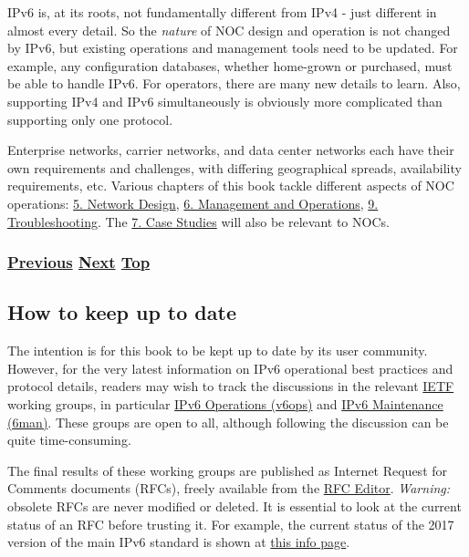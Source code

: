 \documentclass[
]{article}
\begin{document}
IPv6 is, at its roots, not fundamentally different from IPv4 - just
different in almost every detail. So the \emph{nature} of NOC design and
operation is not changed by IPv6, but existing operations and management
tools need to be updated. For example, any configuration databases,
whether home-grown or purchased, must be able to handle IPv6. For
operators, there are many new details to learn. Also, supporting IPv4
and IPv6 simultaneously is obviously more complicated than supporting
only one protocol.

Enterprise networks, carrier networks, and data center networks each
have their own requirements and challenges, with differing geographical
spreads, availability requirements, etc. Various chapters of this book
tackle different aspects of NOC operations: \hyperref[network-design]{5.
Network Design}, \hyperref[management-and-operations]{6. Management and
Operations}, \hyperref[troubleshooting]{9. Troubleshooting}. The
\hyperref[case-studies]{7. Case Studies} will also be relevant to NOCs.

\subsubsection{\texorpdfstring{\hyperref[how-an-application-programmer-sees-ipv6]{Previous}
\hyperref[how-to-keep-up-to-date]{Next}
\hyperref[introduction-and-foreword]{Top}}{Previous Next Top}}\label{previous-next-top-3}

\pagebreak

\subsection{How to keep up to date}\label{how-to-keep-up-to-date}

The intention is for this book to be kept up to date by its user
community. However, for the very latest information on IPv6 operational
best practices and protocol details, readers may wish to track the
discussions in the relevant \href{https://www.ietf.org}{IETF} working
groups, in particular
\href{https://datatracker.ietf.org/wg/v6ops/about/}{IPv6 Operations
(v6ops)} and \href{https://datatracker.ietf.org/wg/6man/about/}{IPv6
Maintenance (6man)}. These groups are open to all, although following
the discussion can be quite time-consuming.

The final results of these working groups are published as Internet
Request for Comments documents (RFCs), freely available from the
\href{https://www.rfc-editor.org/}{RFC Editor}. \emph{Warning:} obsolete
RFCs are never modified or deleted. It is essential to look at the
current status of an RFC before trusting it. For example, the current
status of the 2017 version of the main IPv6 standard is shown at
\href{https://www.rfc-editor.org/info/rfc8200}{this info page}.
\end{document}

